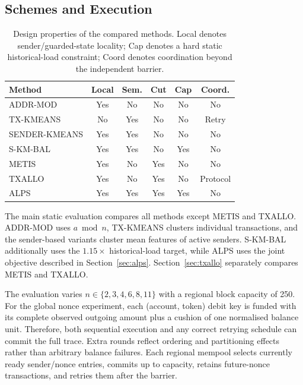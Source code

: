 \documentclass[runningheads]{llncs}
\begin{document}
\subsection{Schemes and Execution}

\begin{table}[t]
\caption{Design properties of the compared methods. Local denotes
sender/guarded-state locality; Cap denotes a hard static historical-load constraint;
Coord denotes coordination beyond the independent barrier.}
\label{tab:design}
\centering
\small
\setlength{\tabcolsep}{3pt}
\begin{tabular}{@{}lccccc@{}}
\toprule
Method & Local & Sem. & Cut & Cap & Coord.\\
\midrule
ADDR-MOD      & Yes & No  & No  & No  & No\\
TX-KMEANS     & No  & Yes & No  & No  & Retry\\
SENDER-KMEANS & Yes & Yes & No  & No  & No\\
S-KM-BAL      & Yes & Yes & No  & Yes & No\\
METIS         & Yes & No  & Yes & No  & No\\
TXALLO        & Yes & No  & Yes & No  & Protocol\\
ALPS          & Yes & Yes & Yes & Yes & No\\
\bottomrule
\end{tabular}
\end{table}

The main static evaluation compares all methods except METIS and TXALLO. ADDR-MOD uses
$a\bmod n$, TX-KMEANS clusters individual transactions, and the sender-based
variants cluster mean features of active senders. S-KM-BAL additionally uses
the $1.15\times$ historical-load target, while ALPS uses the joint objective described in
Section~\ref{sec:alps}. Section~\ref{sec:txallo} separately compares METIS and TXALLO.

The evaluation varies $n\in\{2,3,4,6,8,11\}$ with a regional block capacity of
250. For the global nonce experiment, each (account, token) debit key is funded
with its complete observed outgoing amount plus a cushion of one normalised
balance unit. Therefore, both
sequential execution and any correct retrying schedule can commit the full
trace. Extra rounds reflect ordering and partitioning effects rather than
arbitrary balance failures. Each regional mempool selects currently ready
sender/nonce entries, commits up to capacity, retains future-nonce
transactions, and retries them after the barrier.
\end{document}
